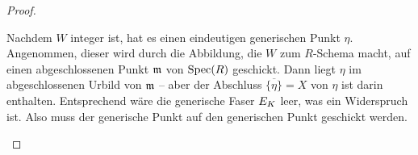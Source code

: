 \begin{Lemma}
\begin{proof}
\begin{description}
      Nachdem $W$ integer ist, hat es einen eindeutigen generischen
      Punkt $\eta$.
      Angenommen, dieser wird durch die Abbildung, die $W$ zum
      $R$-Schema macht, auf einen abgeschlossenen Punkt $\mathfrak{m}$ von $\operatorname{Spec}(R)$
      geschickt.
      Dann liegt $\eta$ im abgeschlossenen Urbild von $\mathfrak{m}$ –
      aber der Abschluss $\overline{\{\eta\}}=X$ von $\eta$ ist darin
      enthalten. Entsprechend wäre die generische Faser $E_{K}$
      leer, was ein Widerspruch ist.
      Also muss der generische Punkt auf den generischen Punkt geschickt
      werden.
    \end{description}
  \end{proof}
\end{Lemma}





